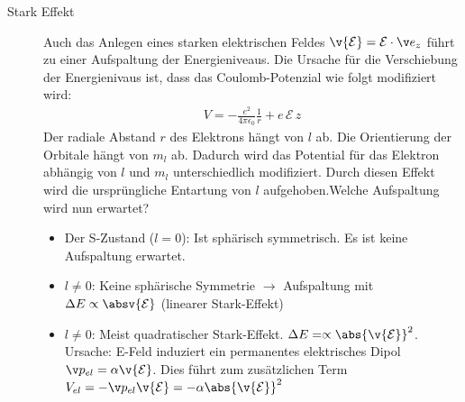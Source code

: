 \documentclass[twocolumn]{summery_4.1}
\begin{document}
\begin{description}
    \item[Stark Effekt]
    Auch das Anlegen eines starken elektrischen Feldes \(\v {\mathcal E} = \mathcal E \cdot \v e_z  \) führt zu einer Aufspaltung der Energieniveaus. Die Ursache für die Verschiebung der Energienivaus ist, dass das Coulomb-Potenzial wie folgt modifiziert wird:
    \begin{align*}
        V=-\frac{e^2}{4\pi\epsilon_0} \frac1r + e\,\mathcal E \,z 
    \end{align*}
    Der radiale Abstand $r$ des Elektrons hängt von $l$ ab. Die Orientierung der Orbitale hängt von $m_l$ ab. Dadurch wird das Potential für das Elektron abhängig von $l$ und $m_l$ unterschiedlich modifiziert. Durch diesen Effekt wird die ursprüngliche Entartung von $l$ aufgehoben.Welche Aufspaltung wird nun erwartet?
    \begin{itemize}
        \item Der S-Zustand (\(l=0\)): Ist sphärisch symmetrisch. Es ist keine Aufspaltung erwartet.
        \item \(l\neq0\): Keine sphärische Symmetrie \(\to\) Aufspaltung mit \(\Delta E \propto \absv{{\mathcal E}}\) (linearer Stark-Effekt)
        \item \(l\neq 0\): Meist quadratischer Stark-Effekt. \(\Delta E =\propto \abs{\v{\mathcal E}}^2\). Ursache: E-Feld induziert ein permanentes elektrisches Dipol \(\v p_{el} = \alpha \v{\mathcal E}\). Dies führt zum zusätzlichen Term \(V_{el} = - \v p_{el} \v{\mathcal E}=-\alpha \abs{\v{\mathcal E}}^2\)
    \end{itemize}


\end{description}
\end{document}
